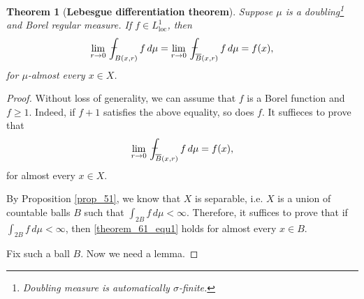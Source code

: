 \documentclass[11pt]{book}
\newtheorem{theorem}{Theorem}[chapter]
\theoremstyle{definition}
\numberwithin{equation}{chapter}
\def\avint{\,\ThisStyle{\ensurestackMath{%
  \stackinset{c}{.2\LMpt}{c}{1\LMpt}{\SavedStyle-}{\SavedStyle\phantom{\int}}}%
  \setbox0=\hbox{$\SavedStyle\int\,$}\kern-\wd0}\int}
\begin{document}
\begin{theorem}[{\bf Lebesgue differentiation theorem}]\label{theorem_61}
Suppose $\mu$ is a doubling\footnote{Doubling measure is automatically $\sigma$-finite.} and Borel regular measure. If $f \in L^1_{\operatorname{loc}}$, then 
\begin{align*}
    \lim_{r\to 0} \avint_{B(x,r)} f \,d\mu = \lim_{r\to 0} \avint_{\overline{B}(x,r)} f \,d\mu = f(x),
\end{align*}
for $\mu$-almost every $x \in X$.
\end{theorem}
\begin{proof}
Without loss of generality, we can assume that $f$ is a Borel function and $f \geq 1$. Indeed, if $f+1$ satisfies the above equality, so does $f$. It suffieces to prove that \begin{align}\label{theorem_61_equ1}
    \lim_{r\to 0} \avint_{\overline{B}(x,r)} f \,d\mu = f(x),
\end{align}
for almost every $x \in X$.

By Proposition \ref{prop_51}, we know that $X$ is separable, i.e. $X$ is a union of countable balls $B$ such that $\int_{2B} f\,d\mu < \infty$. Therefore, it suffices to prove that if $\int_{2B} f\,d\mu < \infty$, then \eqref{theorem_61_equ1} holds for almost every $x \in B$.

Fix such a ball $B$. Now we need a lemma.

\medskip


\end{proof}
\end{document}
